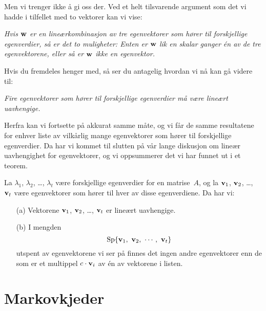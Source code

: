 Men vi trenger ikke å gi oss der.  Ved et helt tilsvarende argument
som det vi hadde i tilfellet med to vektorer kan
vi vise:

\smallskip
\noindent\emph{Hvis $\mathbf{w}$ er en lineærkombinasjon av tre egenvektorer som
  hører til forskjellige egenverdier, så er det to muligheter: Enten
  er $\mathbf{w}$ lik en skalar ganger én av de tre egenvektorene, eller så
  er $\mathbf{w}$ ikke en egenvektor.}
\smallskip

Hvis du fremdeles henger med, så ser du antagelig hvordan vi nå kan gå
videre til:

\smallskip
\noindent\emph{Fire egenvektorer som hører til forskjellige egenverdier
  må være lineært uavhengige.}
\smallskip

Herfra kan vi fortsette på akkurat samme måte, og vi får de samme
resultatene for enhver liste av vilkårlig mange egenvektorer som hører
til forskjellige egenverdier.  Da har vi kommet til slutten på vår
lange diskusjon om lineær uavhengighet for egenvektorer, og vi
oppsummerer det vi har funnet ut i et teorem.

\begin{thm}
\label{thm:egenvektorer-lin-uavh}
La $\lambda_1$, $\lambda_2$, \ldots, $\lambda_t$ være
forskjellige egenverdier for en matrise~$A$, og la $\mathbf{v}_1$,
$\mathbf{v}_2$, \ldots, $\mathbf{v}_t$ være egenvektorer som hører til hver av
disse egenverdiene.  Da har vi:
\begin{enumerate}
\item[(a)] Vektorene $\mathbf{v}_1$, $\mathbf{v}_2$, \ldots, $\mathbf{v}_t$ er lineært uavhengige.
\item[(b)] I mengden
\[
\operatorname{Sp} \{ \mathbf{v}_1,\ \mathbf{v}_2,\ \cdots,\ \mathbf{v}_t \}
\]
utspent av egenvektorene vi ser på finnes det ingen andre egenvektorer
enn de som er et multippel $c \cdot \mathbf{v}_i$ av én av vektorene i
listen.
\end{enumerate}
\end{thm}

\section*{Markovkjeder}



\kapittelslutt
